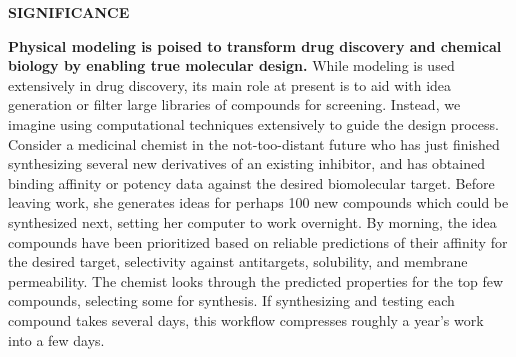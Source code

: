 \documentclass[11pt]{article}
\begin{document}






{\large \bf SIGNIFICANCE}

\textbf{Physical modeling is poised to transform drug discovery and chemical biology by enabling true molecular design.}
While modeling is used extensively in drug discovery, its main role at present is to aid with idea generation or filter large libraries of compounds for screening. 
Instead, we imagine using computational techniques extensively to guide the design process. 
Consider a medicinal chemist in the not-too-distant future who has just finished synthesizing several new derivatives of an existing inhibitor, and has obtained binding affinity or potency data against the desired biomolecular target. 
Before leaving work, she generates ideas for perhaps 100 new compounds which could be synthesized next, setting her computer to work overnight. 
By morning, the idea compounds have been prioritized based on reliable predictions of their affinity for the desired target, selectivity against antitargets, solubility, and membrane permeability.  
The chemist looks through the predicted properties for the top few compounds, selecting some for synthesis. 
If synthesizing and testing each compound takes several days, this workflow compresses roughly a year's work into a few days.
\end{document}
